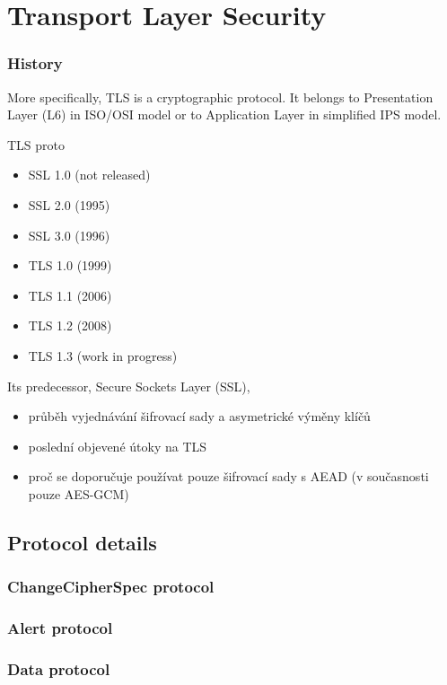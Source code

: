 \chapter{Transport Layer Security}






\subsection{History}

More specifically, TLS is a cryptographic protocol. It belongs to Presentation Layer (L6) in ISO/OSI model or to Application Layer in simplified IPS model.

TLS proto

\begin{itemize}
  \item SSL 1.0 (not released)
  \item SSL 2.0 (1995)
  \item SSL 3.0 (1996)
  \item TLS 1.0 (1999)
  \item TLS 1.1 (2006)
  \item TLS 1.2 (2008)
  \item TLS 1.3 (work in progress)
\end{itemize}

Its predecessor, Secure Sockets Layer (SSL),


\begin{itemize}
  \item průběh vyjednávání šifrovací sady a asymetrické výměny klíčů
  \item poslední objevené útoky na TLS
  \item proč se doporučuje používat pouze šifrovací sady s AEAD (v současnosti pouze AES-GCM)
\end{itemize}





\section{Protocol details}



\subsection{ChangeCipherSpec protocol}
\subsection{Alert protocol}
\subsection{Data protocol}


